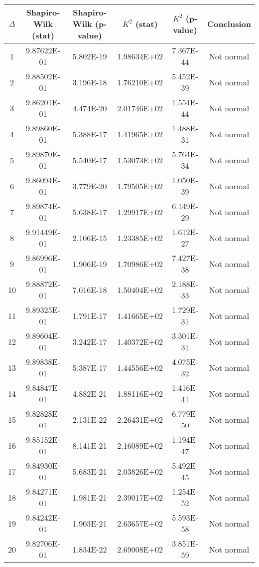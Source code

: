 \begin{table}[h]
	\begin{tabular}{|c|c|c|c|c|c|}
		\hline
		$\Delta$ &  Shapiro-Wilk (stat) & Shapiro-Wilk (p-value) & $K^2$ (stat) & $K^2$ (p-value) & Conclusion\\\hline
		\hline
		1 & 9.87622E-01 & 5.802E-19 & 1.98634E+02 & 7.367E-44 & Not normal\\\hline
		2 & 9.88502E-01 & 3.196E-18 & 1.76210E+02 & 5.452E-39 & Not normal\\\hline
		3 & 9.86201E-01 & 4.474E-20 & 2.01746E+02 & 1.554E-44 & Not normal\\\hline
		4 & 9.89860E-01 & 5.388E-17 & 1.41965E+02 & 1.488E-31 & Not normal\\\hline
		5 & 9.89870E-01 & 5.540E-17 & 1.53073E+02 & 5.764E-34 & Not normal\\\hline
		6 & 9.86094E-01 & 3.779E-20 & 1.79505E+02 & 1.050E-39 & Not normal\\\hline
		7 & 9.89874E-01 & 5.638E-17 & 1.29917E+02 & 6.149E-29 & Not normal\\\hline
		8 & 9.91449E-01 & 2.106E-15 & 1.23385E+02 & 1.612E-27 & Not normal\\\hline
		9 & 9.86996E-01 & 1.906E-19 & 1.70986E+02 & 7.427E-38 & Not normal\\\hline
		10 & 9.88872E-01 & 7.016E-18 & 1.50404E+02 & 2.188E-33 & Not normal\\\hline
		11 & 9.89325E-01 & 1.791E-17 & 1.41665E+02 & 1.729E-31 & Not normal\\\hline
		12 & 9.89604E-01 & 3.242E-17 & 1.40372E+02 & 3.301E-31 & Not normal\\\hline
		13 & 9.89838E-01 & 5.387E-17 & 1.44556E+02 & 4.075E-32 & Not normal\\\hline
		14 & 9.84847E-01 & 4.882E-21 & 1.88116E+02 & 1.416E-41 & Not normal\\\hline
		15 & 9.82828E-01 & 2.131E-22 & 2.26431E+02 & 6.779E-50 & Not normal\\\hline
		16 & 9.85152E-01 & 8.141E-21 & 2.16089E+02 & 1.194E-47 & Not normal\\\hline
		17 & 9.84930E-01 & 5.683E-21 & 2.03826E+02 & 5.492E-45 & Not normal\\\hline
		18 & 9.84271E-01 & 1.981E-21 & 2.39017E+02 & 1.254E-52 & Not normal\\\hline
		19 & 9.84242E-01 & 1.903E-21 & 2.63657E+02 & 5.593E-58 & Not normal\\\hline
		20 & 9.82706E-01 & 1.834E-22 & 2.69008E+02 & 3.851E-59 & Not normal\\\hline

\end{tabular}
\end{table}
